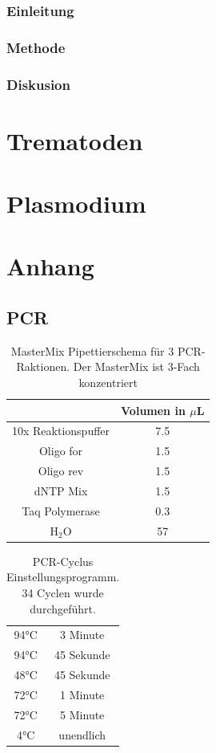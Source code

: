 \documentclass[oneside,10pt,a4paper]{report}
\begin{document}
	\subsection{Einleitung}
	\subsection{Methode}
	\subsection{Diskusion}
	
	
	
	\chapter{Trematoden}
	
	
	\chapter{Plasmodium}
	
	\chapter{Anhang}
	\section{PCR}
	\begin{table}[H]
		\centering
		\caption{MasterMix Pipettierschema für 3 PCR-Raktionen. Der MasterMix ist 3-Fach konzentriert}
		\label{tab: Mastermix-Pipettierschema}
		\begin{tabular}{cc}
			\toprule
			& Volumen in $\mu$L\\
			\midrule
			10x Reaktionspuffer & 7.5 \\
			Oligo for & 1.5\\
			Oligo rev & 1.5\\
			dNTP Mix & 1.5\\
			Taq Polymerase & 0.3\\
			H$_2$O & 57\\
			\bottomrule
		\end{tabular}
	\end{table}
	
	
	\begin{table}[H]
		\centering
		\caption{PCR-Cyclus Einstellungsprogramm. 34 Cyclen wurde durchgeführt.}
		\label{tab: PCR-Cyclen}
		\begin{tabular}{cc}
			\toprule
			94°C & 3 Minute\\
			94°C & 45 Sekunde\\
			48°C & 45 Sekunde\\
			72°C & 1 Minute\\
			72°C & 5 Minute\\
			4°C & unendlich\\
			\bottomrule
		\end{tabular}
	\end{table}
	
	
	
	\nocite{*}
	
	\newpage
\end{document}
